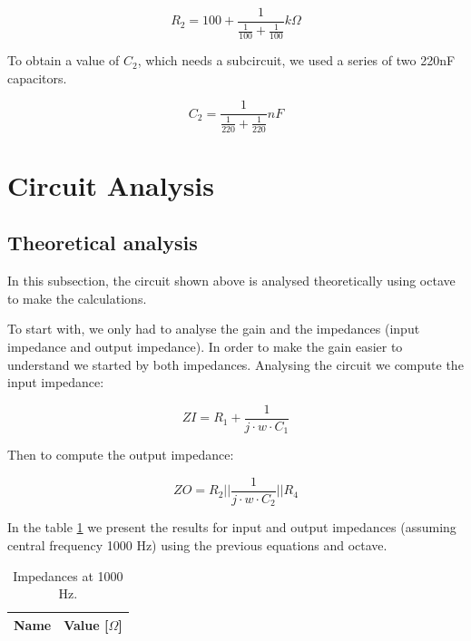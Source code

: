 \begin{equation}
R_2 = 100+\frac{1}{\frac{1}{100}+\frac{1}{100}} k\Omega
\end{equation}

To obtain a value of $C_{2}$, which needs a subcircuit, we used a series of two 220nF capacitors.

\begin{equation}
C_2 = \frac{1}{\frac{1}{220}+\frac{1}{220}} nF
\end{equation}

\newpage
\section{Circuit Analysis}
\label{sec:circuit}
\subsection{Theoretical analysis}
\label{sub:t1}

\par In this subsection, the circuit shown above is analysed theoretically using octave to make the calculations.

To start with, we only had to analyse the gain and the impedances (input impedance and output impedance). In order to make the gain easier to understand we  started by both
impedances. Analysing the circuit we compute the input impedance:

\begin {equation}
ZI = R_1 + \frac{1}{j \cdot w \cdot C_1}
\label{eq:1}
\end {equation}

Then to compute the output impedance: 

\begin {equation}
ZO = R_2||\frac{1}{j \cdot w  \cdot C_2}||R_4
\label{eq:2}
\end {equation}

\par In the table \ref{tab:1} we present the results for input and output impedances (assuming central frequency 1000 Hz) using the previous equations and octave.

\begin{table}[h]
  \centering
  \begin{tabular}{|l|r|}
    \hline    
    {\bf Name} & {\bf Value [{$\Omega$}]} \\ \hline
    
  \end{tabular}
  \caption{Impedances at 1000 Hz.}
  \label{tab:1}
\end{table}

